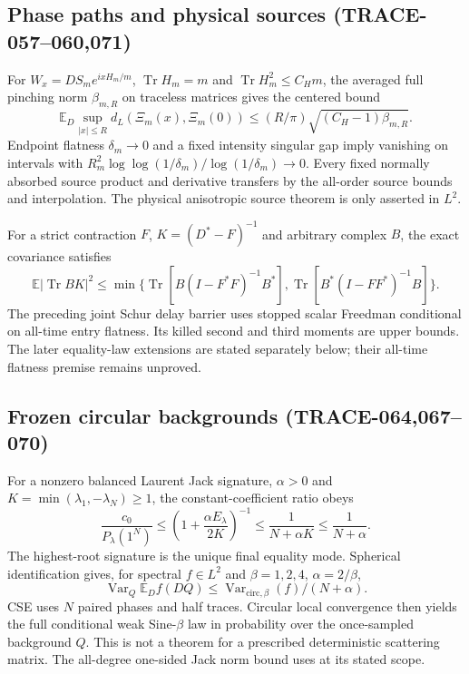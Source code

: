 \subsection{Phase paths and physical sources (TRACE-057--060,071)}
For $W_x=DS_me^{ixH_m/m}$, $\operatorname{Tr}H_m=m$ and
$\operatorname{Tr}H_m^2\le C_Hm$, the averaged full pinching norm
$\beta_{m,R}$ on traceless matrices gives the centered bound
\[
 \mathbb E_D\sup_{|x|\le R}d_L(\Xi_m(x),\Xi_m(0))
 \le (R/\pi)\sqrt{(C_H-1)\beta_{m,R}}.
\]
Endpoint flatness $\delta_m\to0$ and a fixed intensity singular gap imply
vanishing on intervals with
$R_m^2\log\log(1/\delta_m)/\log(1/\delta_m)\to0$.
Every fixed normally absorbed source product and derivative transfers by
the all-order source bounds and interpolation. The physical anisotropic
source theorem is only asserted in $L^2$.

For a strict contraction $F$, $K=(D^*-F)^{-1}$ and arbitrary complex $B$,
the exact covariance satisfies
\[
 \mathbb E|\operatorname{Tr}BK|^2
 \le\min\{\operatorname{Tr}[B(I-F^*F)^{-1}B^*],
          \operatorname{Tr}[B^*(I-FF^*)^{-1}B]\}.
\]
The preceding joint Schur delay barrier uses stopped scalar Freedman
\cite{Tropp2011Chat} conditional on all-time entry flatness. Its killed
second and third moments are upper bounds. The later equality-law extensions
are stated separately below; their all-time flatness premise remains unproved.

\subsection{Frozen circular backgrounds (TRACE-064,067--070)}
For a nonzero balanced Laurent Jack signature, $\alpha>0$ and
$K=\min(\lambda_1,-\lambda_N)\ge1$, the constant-coefficient ratio obeys
\[
 \frac{c_0}{P_\lambda(1^N)}\le
 \left(1+\frac{\alpha E_\lambda}{2K}\right)^{-1}
 \le\frac1{N+\alpha K}\le\frac1{N+\alpha}.
\]
The highest-root signature is the unique final equality mode. Spherical
identification \cite{OO1997Chat,Matsumoto2007Chat} gives, for spectral
$f\in L^2$ and $\beta=1,2,4$, $\alpha=2/\beta$,
\[
 \operatorname{Var}_Q\mathbb E_D f(DQ)
 \le \operatorname{Var}_{\mathrm{circ},\beta}(f)/(N+\alpha).
\]
CSE uses $N$ paired phases and half traces. Circular local convergence
\cite{VV2017Chat} then yields the full conditional weak Sine-$\beta$ law
in probability over the once-sampled background $Q$. This is not a theorem
for a prescribed deterministic scattering matrix. The all-degree one-sided
Jack norm bound uses \cite{JM2015Chat} at its stated scope.

